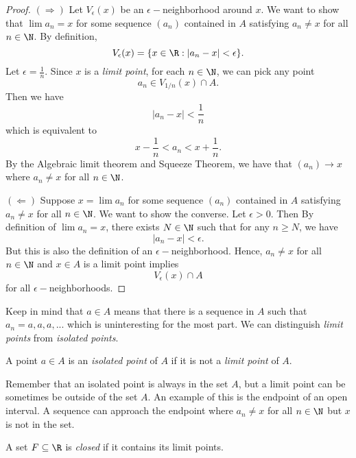 \begin{proof}
    \( (\Rightarrow) \) Let \( V_{\epsilon }(x) \) be an \( \epsilon-\)neighborhood around \( x \). We want to show that \( \lim a_n = x  \) for some sequence \( (a_n) \) contained in \( A  \) satisfying \( a_n \neq x  \) for all \( n \in \N  \). By definition, 
    \[ V_{\epsilon}(x) = \{ x \in \R : | a_n - x  | < \epsilon  \}.  \]
    Let \( \epsilon = \frac{ 1 }{ n }  \). Since \( x  \) is a \textit{limit point}, for each \( n \in \N  \), we can pick any point 
    \[ a_n \in V_{1/n}(x) \cap A. \]Then we have 
    \[  | a_n - x | < \frac{ 1 }{ n }  \]
    which is equivalent to 
    \[ x - \frac{ 1 }{ n } < a_n < x + \frac{ 1 }{ n }. \] 
    By the Algebraic limit theorem and Squeeze Theorem, we have that \( (a_n) \to x  \) where \( a_n \neq x  \) for all \( n \in \N  \). 

    \( (\Leftarrow) \) Suppose \( x = \lim a_n \) for some sequence \( (a_n) \) contained in \( A \) satisfying \( a_n \neq x  \) for all \( n \in \N  \). We want to show the converse. Let \( \epsilon > 0  \). Then By definition of \( \lim a_n = x  \), there exists \( N \in \N  \) such that for any \( n \geq N \), we have  
    \[  | a_n - x  | < \epsilon.  \]
    But this is also the definition of an \( \epsilon-\)neighborhood. Hence, \( a_n \neq x  \) for all \( n \in \N  \) and \( x \in A  \) is a limit point implies 
    \[ V_{\epsilon }(x) \cap A \]
    for all \( \epsilon- \)neighborhoods. 
\end{proof}

Keep in mind that \( a \in A  \) means that there is a sequence in \( A  \) such that \( a_n = {a,a,a, ...} \) which is uninteresting for the most part. We can distinguish \textit{limit points} from \textit{isolated points}.  

\begin{tcolorbox}
\begin{defn}
A point \( a \in A  \) is an \textit{isolated point} of \( A \) if it is not a \textit{limit point} of \( A \).  
\end{defn}
\end{tcolorbox}

Remember that an isolated point is always in the set \( A  \), but a limit point can be sometimes be outside of the set \( A \). An example of this is the endpoint of an open interval. A sequence can approach the endpoint where \( a_n \neq x  \) for all \( n \in \N  \) but \( x  \) is not in the set.  

\begin{tcolorbox}
\begin{defn}
A set \( F \subseteq \R  \) is \textit{closed} if it contains its limit points. 
\end{defn}
\end{tcolorbox}

